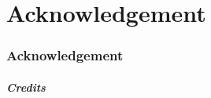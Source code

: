 \part{Acknowledgement}
\section*{Acknowledgement}


\begin{frame}[c,label=credits]
\frametitle{Credits}

\end{frame}
